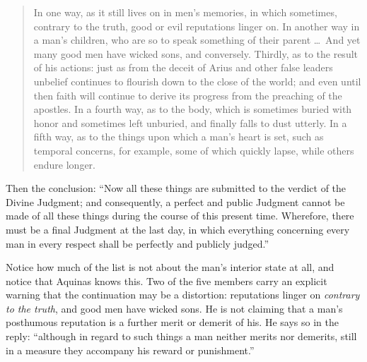 \begin{quote}
In one way, as it still lives on in men's memories, in which sometimes, contrary to the truth, good or evil reputations linger on. In another way in a man's children, who are so to speak something of their parent \ldots\ And yet many good men have wicked sons, and conversely. Thirdly, as to the result of his actions: just as from the deceit of Arius and other false leaders unbelief continues to flourish down to the close of the world; and even until then faith will continue to derive its progress from the preaching of the apostles. In a fourth way, as to the body, which is sometimes buried with honor and sometimes left unburied, and finally falls to dust utterly. In a fifth way, as to the things upon which a man's heart is set, such as temporal concerns, for example, some of which quickly lapse, while others endure longer.
\end{quote}

Then the conclusion: ``Now all these things are submitted to the verdict of the Divine Judgment; and consequently, a perfect and public Judgment cannot be made of all these things during the course of this present time. Wherefore, there must be a final Judgment at the last day, in which everything concerning every man in every respect shall be perfectly and publicly judged.''

Notice how much of the list is not about the man's interior state at all, and notice that Aquinas knows this. Two of the five members carry an explicit warning that the continuation may be a distortion: reputations linger on \emph{contrary to the truth}, and good men have wicked sons. He is not claiming that a man's posthumous reputation is a further merit or demerit of his. He says so in the reply: ``although in regard to such things a man neither merits nor demerits, still in a measure they accompany his reward or punishment.''

